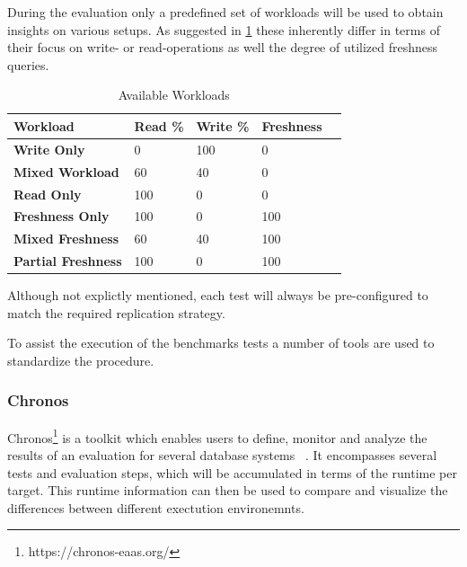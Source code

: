 During the evaluation only a predefined set of workloads will be used to obtain insights on various setups.
As suggested in \ref{tab:workload table} these inherently differ in terms of their focus on write- or read-operations as well the
degree of utilized freshness queries. 

\begin{table}[h]
    \centering
    \begin{tabular}{|l|l|l|l|l|}
    \hline
    \textbf{Workload}        & \textbf{Read \%} & \textbf{Write \%} & \textbf{Freshness}  \\ \hline
    \textbf{Write Only}      & 0                & 100               & 0                             \\ \hline
    \textbf{Mixed Workload}  & 60               & 40                & 0                             \\ \hline
    \textbf{Read Only}       & 100              & 0                 & 0                             \\ \hline
    \textbf{Freshness Only} & 100              & 0                 & 100                           \\ \hline
    \textbf{Mixed Freshness} & 60              & 40                 & 100                           \\ \hline
    \textbf{Partial Freshness} & 100              & 0                 & 100                           \\ \hline
    \end{tabular}
    \caption{Available Workloads}
    \label{tab:workload table}
\end{table}

Although not explictly mentioned, each test will always be pre-configured to match the required replication strategy.  

To assist the execution of the benchmarks tests a number of tools are used to standardize the procedure.

\subsubsection{Chronos}

Chronos\footnote{https://chronos-eaas.org/} is a toolkit which enables users to define, 
monitor and analyze the results of an evaluation for several database systems ~\cite{vogt_chronos_2020}.
It encompasses several tests and evaluation steps, which will be accumulated in terms of the runtime 
per target. This runtime information can then be used to compare and visualize the differences between different exectution environemnts.  



